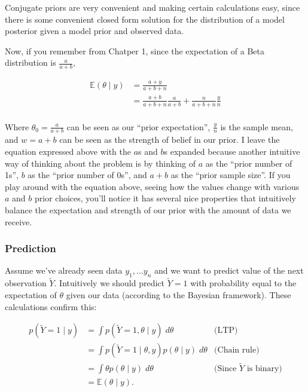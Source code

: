 \documentclass[
]{article}
\begin{document}
Conjugate priors are very convenient and making certain calculations
easy, since there is some convenient closed form solution for the
distribution of a model posterior given a model prior and observed data.

Now, if you remember from Chatper 1, since the expectation of a Beta
distribution is \(\frac{a}{a + b}\),

\begin{align}
\mathbb{E}(\theta \mid y) &= \frac{a + y}{a + b + n} \\
&= \frac{a + b}{a + b + n} \frac{a}{a + b} + \frac{n}{a + b + n}\frac{y}{n} \\
\end{align}

Where \(\theta_0 = \frac{a}{a + b}\) can be seen as our ``prior
expectation'', \(\frac{y}{n}\) is the sample mean, and \(w = a + b\) can
be seen as the strength of belief in our prior. I leave the equation
expressed above with the \(a\)s and \(b\)s expanded because another
intuitive way of thinking about the problem is by thinking of \(a\) as
the ``prior number of 1s'', \(b\) as the ``prior number of 0s'', and
\(a + b\) as the ``prior sample size''. If you play around with the
equation above, seeing how the values change with various \(a\) and
\(b\) prior choices, you'll notice it has several nice properties that
intuitively balance the expectation and strength of our prior with the
amount of data we receive.

\hypertarget{prediction}{%
\subsubsection{Prediction}\label{prediction}}

Assume we've already seen data \(y_1, \dots y_n\) and we want to predict
value of the next observation \(\tilde{Y}\). Intuitively we should
predict \(\tilde{Y} = 1\) with probability equal to the expectation of
\(\theta\) given our data (according to the Bayesian framework). These
calculations confirm this:

\begin{align}
p(\tilde{Y} = 1 \mid y) &= \int p(\tilde{Y} = 1, \theta \mid y) \; d\theta & \text{(LTP)} \\
&= \int p(\tilde{Y} = 1 \mid \theta, y) p(\theta \mid y) \; d\theta & \text{(Chain rule)} \\
&= \int \theta p(\theta \mid y) \; d\theta & \text{(Since $\tilde{Y}$ is binary)} \\
&= \mathbb{E}(\theta \mid y).
\end{align}
\end{document}
